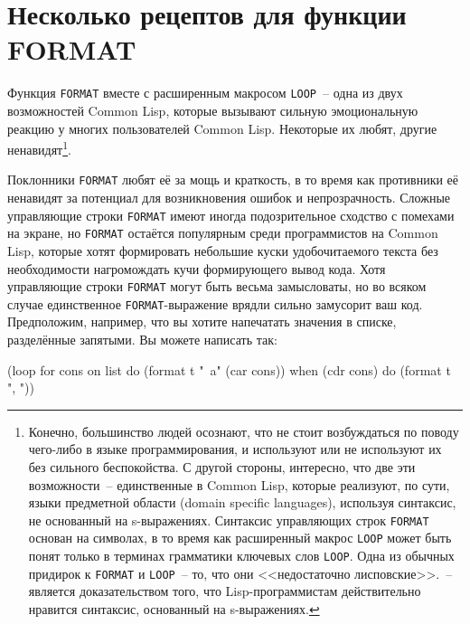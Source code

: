 \chapter{Несколько рецептов для функции FORMAT}
\label{ch:18}

\thispagestyle{empty}

Функция \lstinline{FORMAT} вместе с расширенным макросом \lstinline{LOOP}~-- одна из двух
возможностей Common Lisp, которые вызывают сильную эмоциональную реакцию у многих
пользователей Common Lisp. Некоторые их любят, другие ненавидят\footnote{Конечно,
  большинство людей осознают, что не стоит возбуждаться по поводу чего-либо в языке
  программирования, и используют или не используют их без сильного беспокойства. С другой
  стороны, интересно, что две эти возможности~-- единственные в Common Lisp, которые
  реализуют, по сути, языки предметной области (domain specific languages), используя
  синтаксис, не основанный на s-выражениях. Синтаксис управляющих строк \lstinline{FORMAT}
  основан на символах, в то время как расширенный макрос \lstinline{LOOP} может быть понят
  только в терминах грамматики ключевых слов \lstinline{LOOP}.  Одна из обычных придирок к
  \lstinline{FORMAT} и \lstinline{LOOP}~-- то, что они <<недостаточно лисповские>>.~--
  является доказательством того, что Lisp-программистам действительно нравится синтаксис,
  основанный на s-выражениях.}\hspace{\footnotenegspace}.

Поклонники \lstinline{FORMAT} любят её за мощь и краткость, в то время как противники её
ненавидят за потенциал для возникновения ошибок и непрозрачность. Сложные управляющие
строки \lstinline{FORMAT} имеют иногда подозрительное сходство с помехами на
экране, но \lstinline{FORMAT} остаётся популярным
среди программистов на Common Lisp, которые хотят формировать небольшие куски
удобочитаемого текста без необходимости нагромождать кучи формирующего вывод кода. Хотя
управляющие строки \lstinline{FORMAT} могут быть весьма замысловаты, но во всяком случае
единственное \lstinline{FORMAT}-выражение врядли сильно замусорит ваш код.  Предположим,
например, что вы хотите напечатать значения в списке, разделённые запятыми. Вы можете
написать так:

\begin{myverb}
(loop for cons on list
    do (format t "~a" (car cons))
    when (cdr cons) do (format t ", "))
\end{myverb}

